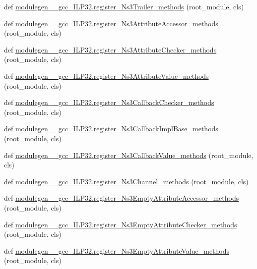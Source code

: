 \begin{DoxyCompactItemize}
\item 
def \hyperlink{namespacemodulegen____gcc__ILP32_a7be1ac5e0e1a8ec544474f384e1642fc}{modulegen\+\_\+\+\_\+gcc\+\_\+\+I\+L\+P32.\+register\+\_\+\+Ns3\+Trailer\+\_\+methods} (root\+\_\+module, cls)
\item 
def \hyperlink{namespacemodulegen____gcc__ILP32_a8f1258b8ab8ec43af174fc3ff9198eb6}{modulegen\+\_\+\+\_\+gcc\+\_\+\+I\+L\+P32.\+register\+\_\+\+Ns3\+Attribute\+Accessor\+\_\+methods} (root\+\_\+module, cls)
\item 
def \hyperlink{namespacemodulegen____gcc__ILP32_a891dd82b08e1260e01670cf52c90138c}{modulegen\+\_\+\+\_\+gcc\+\_\+\+I\+L\+P32.\+register\+\_\+\+Ns3\+Attribute\+Checker\+\_\+methods} (root\+\_\+module, cls)
\item 
def \hyperlink{namespacemodulegen____gcc__ILP32_a7475be8fb4d2d4611c513f6d21c50a32}{modulegen\+\_\+\+\_\+gcc\+\_\+\+I\+L\+P32.\+register\+\_\+\+Ns3\+Attribute\+Value\+\_\+methods} (root\+\_\+module, cls)
\item 
def \hyperlink{namespacemodulegen____gcc__ILP32_acf2267ead3a407631a6fe495c0560d6b}{modulegen\+\_\+\+\_\+gcc\+\_\+\+I\+L\+P32.\+register\+\_\+\+Ns3\+Callback\+Checker\+\_\+methods} (root\+\_\+module, cls)
\item 
def \hyperlink{namespacemodulegen____gcc__ILP32_a9a85026102c692583453c9b637b8b837}{modulegen\+\_\+\+\_\+gcc\+\_\+\+I\+L\+P32.\+register\+\_\+\+Ns3\+Callback\+Impl\+Base\+\_\+methods} (root\+\_\+module, cls)
\item 
def \hyperlink{namespacemodulegen____gcc__ILP32_a08e2760d3ccd91256fbce9ef63b1e10b}{modulegen\+\_\+\+\_\+gcc\+\_\+\+I\+L\+P32.\+register\+\_\+\+Ns3\+Callback\+Value\+\_\+methods} (root\+\_\+module, cls)
\item 
def \hyperlink{namespacemodulegen____gcc__ILP32_ae5495d57da47c2b867b78489fd5168e0}{modulegen\+\_\+\+\_\+gcc\+\_\+\+I\+L\+P32.\+register\+\_\+\+Ns3\+Channel\+\_\+methods} (root\+\_\+module, cls)
\item 
def \hyperlink{namespacemodulegen____gcc__ILP32_a489a942ef59028089c93b9dea61069a3}{modulegen\+\_\+\+\_\+gcc\+\_\+\+I\+L\+P32.\+register\+\_\+\+Ns3\+Empty\+Attribute\+Accessor\+\_\+methods} (root\+\_\+module, cls)
\item 
def \hyperlink{namespacemodulegen____gcc__ILP32_a46ed8d8e239b38c1a4353a533fcb77a2}{modulegen\+\_\+\+\_\+gcc\+\_\+\+I\+L\+P32.\+register\+\_\+\+Ns3\+Empty\+Attribute\+Checker\+\_\+methods} (root\+\_\+module, cls)
\item 
def \hyperlink{namespacemodulegen____gcc__ILP32_a4f1a7f7e506590df165bd2f16ec88878}{modulegen\+\_\+\+\_\+gcc\+\_\+\+I\+L\+P32.\+register\+\_\+\+Ns3\+Empty\+Attribute\+Value\+\_\+methods} (root\+\_\+module, cls)

\end{DoxyCompactItemize}

